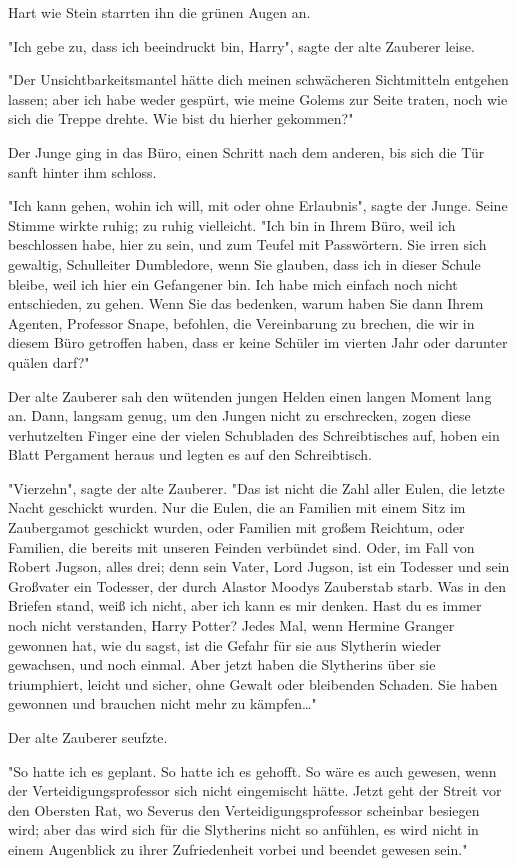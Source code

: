 {Hart wie Stein starrten ihn die grünen Augen an.

"Ich gebe zu, dass ich beeindruckt bin, Harry", sagte der alte Zauberer leise.

"Der Unsichtbarkeitsmantel hätte dich meinen schwächeren Sichtmitteln entgehen lassen; aber ich habe weder gespürt, wie meine Golems zur Seite traten, noch wie sich die Treppe drehte. Wie bist du hierher gekommen?"

Der Junge ging in das Büro, einen Schritt nach dem anderen, bis sich die Tür sanft hinter ihm schloss.

"Ich kann gehen, wohin ich will, mit oder ohne Erlaubnis", sagte der Junge. Seine Stimme wirkte ruhig; zu ruhig vielleicht. "Ich bin in Ihrem Büro, weil ich beschlossen habe, hier zu sein, und zum Teufel mit Passwörtern. Sie irren sich gewaltig, Schulleiter Dumbledore, wenn Sie glauben, dass ich in dieser Schule bleibe, weil ich hier ein Gefangener bin. Ich habe mich einfach noch nicht entschieden, zu gehen. Wenn Sie das bedenken, warum haben Sie dann Ihrem Agenten, Professor Snape, befohlen, die Vereinbarung zu brechen, die wir in diesem Büro getroffen haben, dass er keine Schüler im vierten Jahr oder darunter quälen darf?"

Der alte Zauberer sah den wütenden jungen Helden einen langen Moment lang an. Dann, langsam genug, um den Jungen nicht zu erschrecken, zogen diese verhutzelten Finger eine der vielen Schubladen des Schreibtisches auf, hoben ein Blatt Pergament heraus und legten es auf den Schreibtisch.

"Vierzehn", sagte der alte Zauberer. "Das ist nicht die Zahl aller Eulen, die letzte Nacht geschickt wurden. Nur die Eulen, die an Familien mit einem Sitz im Zaubergamot geschickt wurden, oder Familien mit großem Reichtum, oder Familien, die bereits mit unseren Feinden verbündet sind. Oder, im Fall von Robert Jugson, alles drei; denn sein Vater, Lord Jugson, ist ein Todesser und sein Großvater ein Todesser, der durch Alastor Moodys Zauberstab starb. Was in den Briefen stand, weiß ich nicht, aber ich kann es mir denken. Hast du es immer noch nicht verstanden, Harry Potter? Jedes Mal, wenn Hermine Granger gewonnen hat, wie du sagst, ist die Gefahr für sie aus Slytherin wieder gewachsen, und noch einmal. Aber jetzt haben die Slytherins über sie triumphiert, leicht und sicher, ohne Gewalt oder bleibenden Schaden. Sie haben gewonnen und brauchen nicht mehr zu kämpfen…"

Der alte Zauberer seufzte.

"So hatte ich es geplant. So hatte ich es gehofft. So wäre es auch gewesen, wenn der Verteidigungsprofessor sich nicht eingemischt hätte. Jetzt geht der Streit vor den Obersten Rat, wo Severus den Verteidigungsprofessor scheinbar besiegen wird; aber das wird sich für die Slytherins nicht so anfühlen, es wird nicht in einem Augenblick zu ihrer Zufriedenheit vorbei und beendet gewesen sein."

}
